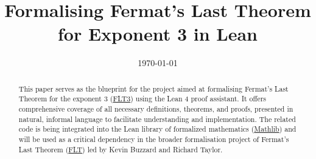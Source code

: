 \documentclass[11pt,a4paper]{report}
\title{Formalising Fermat's Last Theorem for Exponent 3 in Lean}
\date{\today}
\begin{document}
\maketitle
\begin{abstract}
    This paper serves as the blueprint for the project aimed at formalising Fermat’s Last Theorem
    for the exponent 3 (\href{https://github.com/pitmonticone/FLT3}{FLT3}) using the Lean 4 proof assistant.
    It offers comprehensive coverage of all necessary definitions, theorems, and proofs, presented in natural,
    informal language to facilitate understanding and implementation. The related code is being integrated
    into the Lean library of formalized mathematics (\href{https://github.com/leanprover-community/mathlib4}{Mathlib})
    and will be used as a critical dependency in the broader formalisation project of Fermat's Last Theorem
    (\href{https://github.com/ImperialCollegeLondon/FLT}{FLT}) led by Kevin Buzzard and Richard Taylor.
\end{abstract}
\tableofcontents



\nocite{*}
\printbibliography[title=References]
\end{document}
